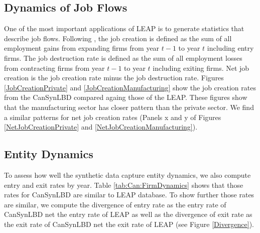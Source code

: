 \subsection{Dynamics of Job Flows}

One of the most important applications of LEAP is to generate statistics that describe job flows. Following \cite{DavisHaltiwangerSchuh}, the job creation is defined as the sum of all employment gains from expanding firms from year $t-1$ to year $t$ including entry firms. The job destruction rate is defined as the sum of all employment losses from contracting firms from year $t-1$ to year $t$ including exiting firms. Net job creation is the job creation rate minus the job destruction rate. Figures \ref{JobCreationPrivate} and \ref{JobCreationManufacturing} show the job creation rates from the CanSynLBD compared againg those of the LEAP. These figures show that the manufacturing sector has closer pattern than the private sector. We find a similar patterns for net job creation rates (Panels x and y of Figures \ref{NetJobCreationPrivate} and  \ref{NetJobCreationManufacturing}).



\subsection{Entity Dynamics}
To assess how well the synthetic data capture entity dynamics, we also compute entry and exit rates  by year. Table \ref{tab:Can:FirmDynamics} shows that those rates for CanSynLBD are similar to LEAP database. To show further those rates are similar, we compute the divergence of entry rate as the entry rate of CanSynLBD net the entry rate of LEAP as well as the divergence of exit rate as the exit rate of CanSynLBD net the exit rate of LEAP (see Figure \ref{Divergence}).

